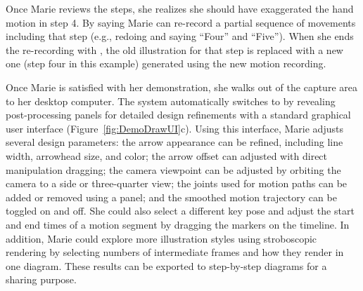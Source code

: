 Once Marie reviews the steps, she realizes she should have exaggerated the hand motion in step 4. By saying  Marie can re-record a partial sequence of movements including that step (e.g., redoing and saying ``Four'' and ``Five'').
When she ends the re-recording with , the old illustration for that step is replaced with a new one (step four in this example) generated using the new motion recording.
%
%

Once Marie is satisfied with her demonstration, she walks out of the capture area to her desktop computer. The system automatically switches to \phaseII{} by revealing post-processing panels for detailed design refinements with a standard graphical user interface (Figure~\ref{fig:DemoDrawUI}c).
Using this interface, Marie adjusts several design parameters:
the arrow appearance can be refined, including line width, arrowhead size, and color;
the arrow offset can adjusted with direct manipulation dragging; %
the camera viewpoint can be adjusted by orbiting the camera to a side or three-quarter view;
the joints used for motion paths can be added or removed using a panel;
and the smoothed motion trajectory can be toggled on and off.
%
She could also select a different key pose and adjust the start and end times of a motion segment by dragging the markers on the timeline.
%
In addition, Marie could explore more illustration styles using stroboscopic rendering by selecting numbers of intermediate frames and how they render in one diagram.
%
These results can be exported to step-by-step diagrams for a sharing purpose.

